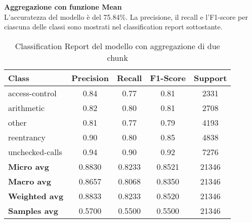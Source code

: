 \documentclass[../../Thesis.tex]{subfiles}
\begin{document}
\textbf{Aggregazione con funzione Mean}\\
L'accuratezza del modello è del 75.84\%. La precisione, il recall e l'F1-score per ciascuna delle classi sono mostrati nel classification report sottostante.
\begin{table}[H]
    \centering
    \small
    \begin{tabular}{lcccc}
    \hline
    \textbf{Class} & \textbf{Precision} & \textbf{Recall} & \textbf{F1-Score} & \textbf{Support} \\
    \hline
    access-control & 0.84 & 0.77 & 0.81 & 2331 \\
    arithmetic & 0.82 & 0.80 & 0.81 & 2708 \\
    other & 0.81 & 0.77 & 0.79 & 4193 \\
    reentrancy & 0.90 & 0.80 & 0.85 & 4838 \\
    unchecked-calls & 0.94 & 0.90 & 0.92 & 7276 \\
    \hline
    \textbf{Micro avg} & 0.8830 & 0.8233 & 0.8521 & 21346 \\
    \textbf{Macro avg} & 0.8657 & 0.8068 & 0.8350 & 21346 \\
    \textbf{Weighted avg} & 0.8833 & 0.8233 & 0.8520 & 21346 \\
    \textbf{Samples avg} & 0.5700 & 0.5500 & 0.5500 & 21346 \\
    \hline
    \end{tabular}
    \caption{Classification Report del modello con aggregazione di due chunk}
    \end{table}


    
\end{document}

